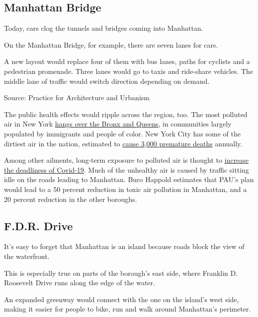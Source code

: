 \hypertarget{manhattan-bridge}{%
\subsection{Manhattan Bridge}\label{manhattan-bridge}}

Today, cars clog the tunnels and bridges coming into Manhattan.

On the Manhattan Bridge, for example, there are seven lanes for cars.

A new layout would replace four of them with bus lanes, paths for
cyclists and a pedestrian promenade. Three lanes would go to taxis and
ride-share vehicles. The middle lane of traffic would switch direction
depending on demand.

Source: Practice for Architecture and Urbanism

The public health effects would ripple across the region, too. The most
polluted air in New York
\href{https://www.ucsusa.org/sites/default/files/attach/2019/06/Inequitable-Exposure-to-Vehicle-Pollution-NY.pdf}{hangs
over the Bronx and Queens}, in communities largely populated by
immigrants and people of color. New York City has some of the dirtiest
air in the nation, estimated to
\href{https://www1.nyc.gov/assets/doh/downloads/pdf/eode/eode-air-quality-impact.pdf}{cause
3,000 premature deaths} annually.

Among other ailments, long-term exposure to polluted air is thought to
\href{https://www.nytimes3xbfgragh.onion/2020/04/07/climate/air-pollution-coronavirus-covid.html}{increase
the deadliness of Covid-19}. Much of the unhealthy air is caused by
traffic sitting idle on the roads leading to Manhattan. Buro Happold
estimates that PAU's plan would lead to a 50 percent reduction in toxic
air pollution in Manhattan, and a 20 percent reduction in the other
boroughs.

\hypertarget{fdr-drive}{%
\subsection{F.D.R. Drive}\label{fdr-drive}}

It's easy to forget that Manhattan is an island because roads block the
view of the waterfront.

This is especially true on parts of the borough's east side, where
Franklin D. Roosevelt Drive runs along the edge of the water.

An expanded greenway would connect with the one on the island's west
side, making it easier for people to bike, run and walk around
Manhattan's perimeter.

